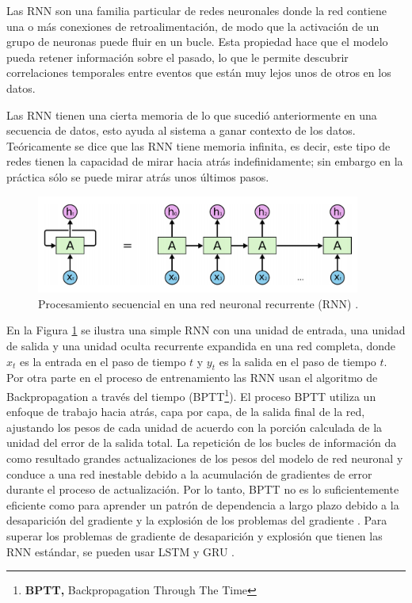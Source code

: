 \vspace{5mm} %

Las RNN son una familia particular de redes neuronales donde la red contiene una o más conexiones de retroalimentación, de modo que la activación de un grupo de neuronas puede fluir en un bucle. Esta propiedad hace que el modelo pueda retener informaci\'{o}n sobre el pasado, lo que le permite descubrir correlaciones temporales entre eventos que est\'{a}n muy lejos unos de otros en los datos.

\vspace{5mm} %

Las RNN tienen una cierta memoria de lo que sucedi\'{o} anteriormente en una secuencia de datos, esto ayuda al sistema a ganar contexto de los datos. Te\'{o}ricamente se dice que las RNN tiene memoria infinita, es decir, este tipo de redes tienen la capacidad de mirar hacia atr\'{a}s indefinidamente; sin embargo en la pr\'{a}ctica s\'{o}lo se puede mirar atr\'{a}s unos \'{u}ltimos pasos.

\begin{figure}[h!]
  \begin{center}	\includegraphics[width=0.95\textwidth]{imagenes/Cap4/rnn}
  \caption{Procesamiento secuencial en una red neuronal recurrente (RNN) \cite{53}.}
  \label{fig:rnn}
  \end{center}
\end{figure}

En la Figura \ref{fig:rnn} se ilustra una simple RNN con una unidad de entrada, una unidad de salida y una unidad oculta recurrente expandida en una red completa, donde $x_{t}$ es la entrada en el paso de tiempo $t$ y $y_{t}$ es la salida en el paso de tiempo $t$. Por otra parte en el proceso de entrenamiento las RNN usan el algoritmo de Backpropagation a trav\'{e}s del tiempo (BPTT\footnote{\textbf{BPTT,} Backpropagation Through The Time}). El proceso BPTT utiliza un enfoque de trabajo hacia atrás, capa por capa, de la salida final de la red, ajustando los pesos de cada unidad de acuerdo con la porción calculada de la unidad del error de la salida total. La repetición de los bucles de información da como resultado grandes actualizaciones de los pesos del modelo de red neuronal y conduce a una red inestable debido a la acumulación de gradientes de error durante el proceso de actualización. Por lo tanto, BPTT no es lo suficientemente eficiente como para aprender un patrón de dependencia a largo plazo debido a la desaparición del gradiente y la explosión de los problemas del gradiente \cite{50}. Para superar los problemas de gradiente de desaparición y explosión que tienen las RNN estándar, se pueden usar LSTM y GRU \cite{51}.

